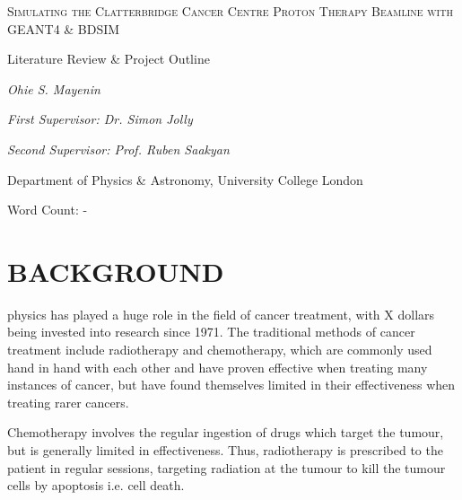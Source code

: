 \documentclass[a4paper, 12pt, conference]
{ieeeconf}      %
\begin{document}
\begin{titlepage}
	\centering
     
	{\scshape\Huge Simulating the Clatterbridge Cancer Centre Proton Therapy Beamline with GEANT4 \& BDSIM \par}
	\vspace{0.5cm}
	{\scshape\Large{Literature Review \& Project Outline\par}}
	\vspace{1cm}
	{\large\itshape Ohie S. Mayenin\par}
    \vspace{1cm}
    {\itshape First Supervisor: Dr. Simon Jolly\par}
    {\itshape Second Supervisor: Prof. Ruben Saakyan\par}
    \vspace{0.5cm}
    {Department of Physics \& Astronomy, University College London\par}
	\vspace{1cm}
    \vfill
	Word Count: -
	\vfill
\end{titlepage}





\section{BACKGROUND}

 physics has played a huge role in the field of cancer treatment, with X dollars being invested into research since 1971. The traditional methods of cancer treatment include radiotherapy and chemotherapy, which are commonly used hand in hand with each other and have proven effective when treating many instances of cancer, but have found themselves limited in their effectiveness when treating rarer cancers.

Chemotherapy involves the regular ingestion of drugs which target the tumour, but is generally limited in effectiveness. Thus, radiotherapy is prescribed to the patient in regular sessions, targeting radiation at the tumour to kill the tumour cells by apoptosis i.e. cell death. 
\end{document}
